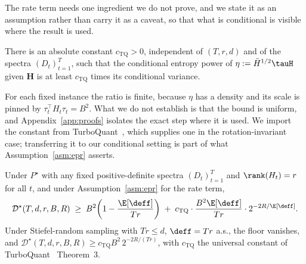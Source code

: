 The rate term needs one ingredient we do not prove, and we state it as an
assumption rather than carry it as a caveat, so that what is conditional is
visible where the result is used.

\begin{assumption}\label{asm:epr}
There is an absolute constant $c_{\mathrm{TQ}} > 0$, independent of
$(T, r, d)$ and of the spectra $(D_t)_{t=1}^T$, such that the conditional
entropy power of $\eta := \bar H^{1/2}\tauH$ given $\boldsymbol H$ is at least
$c_{\mathrm{TQ}}$ times its conditional variance.
\end{assumption}

For each fixed instance the ratio is finite, because $\eta$ has a density and
its scale is pinned by $\tau_t^\top H_t \tau_t = B^2$. What we do not establish
is that the bound is uniform, and Appendix~\ref{app:proofs} isolates the exact
step where it is used. We import the constant from
TurboQuant~\citep{zandieh2025turboquant}, which supplies one in the
rotation-invariant case; transferring it to our conditional setting is part of
what Assumption~\ref{asm:epr} asserts.

\begin{theorem}\label{thm:general}
Under $P^\star$ with any fixed positive-definite spectra
$(D_t)_{t=1}^T$ and $\rank(H_t) = r$ for all $t$, and under
Assumption~\ref{asm:epr} for the rate term,
\begin{equation}\label{eq:thm-lb}
  \mathcal{D}^\star(T, d, r, B, R)
  \;\geq\;
  B^2\!\left(1 - \frac{\E[\deff]}{Tr}\right)
  \;+\; c_{\mathrm{TQ}}\cdot\frac{B^2\E[\deff]}{Tr}
  \cdot 2^{-2R/\E[\deff]}.
\end{equation}
Under Stiefel-random sampling with $Tr\leq d$, $\deff = Tr$ a.s., the
floor vanishes, and
$\mathcal{D}^\star(T,d,r,B,R) \geq c_{\mathrm{TQ}} B^2\,
2^{-2R/(Tr)}$, with $c_{\mathrm{TQ}}$ the universal constant of
TurboQuant~\citep{zandieh2025turboquant} Theorem~3.
\end{theorem}

